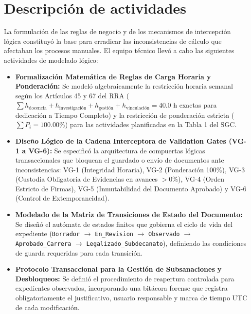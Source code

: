 \documentclass[12pt,a4paper]{article}
\begin{document}
\section{Descripción de actividades}
La formulación de las reglas de negocio y de los mecanismos de intercepción lógica constituyó la base para erradicar las inconsistencias de cálculo que afectaban los procesos manuales. El equipo técnico llevó a cabo las siguientes actividades de modelado lógico:

\begin{itemize}[leftmargin=1.5em, itemsep=4pt]
    \item \textbf{Formalización Matemática de Reglas de Carga Horaria y Ponderación:} Se modeló algebraicamente la restricción horaria semanal según los Artículos 45 y 67 del RRA ($\sum h_{\text{docencia}} + h_{\text{investigación}} + h_{\text{gestión}} + h_{\text{vinculación}} = 40.0\text{ h}$ exactas para dedicación a Tiempo Completo) y la restricción de ponderación estricta ($\sum P_i = 100.00\%$) para las actividades planificadas en la Tabla 1 del SGC.
    \item \textbf{Diseño Lógico de la Cadena Interceptora de Validation Gates (VG-1 a VG-6):} Se especificó la arquitectura de compuertas lógicas transaccionales que bloquean el guardado o envío de documentos ante inconsistencias: VG-1 (Integridad Horaria), VG-2 (Ponderación 100\%), VG-3 (Custodia Obligatoria de Evidencias en avances $>0\%$), VG-4 (Orden Estricto de Firmas), VG-5 (Inmutabilidad del Documento Aprobado) y VG-6 (Control de Extemporaneidad).
    \item \textbf{Modelado de la Matriz de Transiciones de Estado del Documento:} Se diseñó el autómata de estados finitos que gobierna el ciclo de vida del expediente (\texttt{Borrador} $\to$ \texttt{En\_\allowbreak  Revision} $\to$ \texttt{Observado} $\to$ \texttt{Aprobado\_\allowbreak   Carrera} $\to$ \texttt{Legalizado\_\allowbreak   Subdecanato}), definiendo las condiciones de guarda requeridas para cada transición.
    \item \textbf{Protocolo Transaccional para la Gestión de Subsanaciones y Desbloqueos:} Se definió el procedimiento de reapertura controlada para expedientes observados, incorporando una bitácora forense que registra obligatoriamente el justificativo, usuario responsable y marca de tiempo UTC de cada modificación.
\end{itemize}
\end{document}
